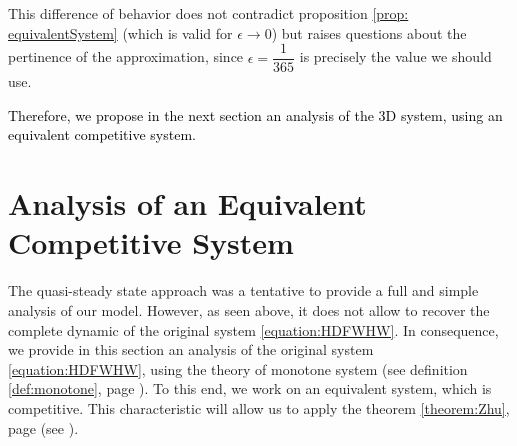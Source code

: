 \documentclass{article}
\newcommand{\vdeux}[1]{\textcolor{black}{#1}}
\theoremstyle{definition}
\theoremstyle{remark}
\begin{document}
This difference of behavior does not contradict proposition \ref{prop: equivalentSystem} (which is valid for $\epsilon \rightarrow 0$) but raises questions about the pertinence of the approximation, since $\epsilon = \dfrac{1}{365}$ is precisely the value we should use. 

\vdeux{Therefore, we propose in the next section an analysis of the 3D system, using an equivalent competitive system.}

\section{Analysis of an Equivalent Competitive System} \label{sec:competitive}
The quasi-steady state approach was a tentative to provide a full and simple analysis of our model. However, as seen above, it does not allow to recover the complete dynamic of the original system \eqref{equation:HDFWHW}. In consequence, we provide in this section an analysis of the original system \eqref{equation:HDFWHW}, using the theory of monotone system (see definition \ref{def:monotone}, page \pageref{def:monotone}). To this end, we work on an equivalent system, which is competitive. This characteristic will allow us to apply the theorem \ref{theorem:Zhu}, page \pageref{theorem:Zhu} (see \cite{zhu_stable_1994}).
\end{document}
